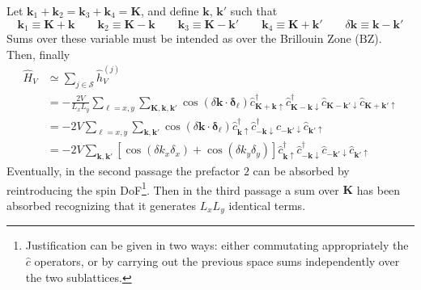 Let $\mathbf{k}_1 + \mathbf{k}_2 = \mathbf{k}_3 + \mathbf{k}_4 = \mathbf{K}$, and define $\mathbf{k}$, $\mathbf{k}'$ such that
\[
	\mathbf{k}_1 \equiv \mathbf{K} + \mathbf{k} 
	\qquad
	\mathbf{k}_2 \equiv \mathbf{K} - \mathbf{k} 
	\qquad
	\mathbf{k}_3 \equiv \mathbf{K} - \mathbf{k}' 
	\qquad
	\mathbf{k}_4 \equiv \mathbf{K} + \mathbf{k}'
	\qquad
	\delta \mathbf{k} \equiv \mathbf{k}-\mathbf{k}'
\]
Sums over these variable must be intended as over the Brillouin Zone ($\mathrm{BZ}$). Then, finally
\[
\begin{aligned}
	\hat H_V &\simeq \sum_{j \in \mathcal{S}} \hat h_V^{(j)} \\
	&= - \frac{2V}{L_x L_y} \sum_{\ell = x,y} \sum_{\mathbf{K}, \mathbf{k}, \mathbf{k}'} \cos\left(
		\delta \mathbf{k} \cdot \bm{\delta}_\ell
	\right)	\hat c_{\mathbf{K}+\mathbf{k} \uparrow}^\dagger \hat c_{\mathbf{K}-\mathbf{k} \downarrow}^\dagger \hat c_{\mathbf{K}-\mathbf{k}' \downarrow} \hat c_{\mathbf{K}+\mathbf{k}'\uparrow} \\
	&= -2V \sum_{\ell = x,y} \sum_{\mathbf{k}, \mathbf{k}'} \cos\left(
		\delta \mathbf{k} \cdot \bm{\delta}_\ell
	\right)	\hat c_{\mathbf{k} \uparrow}^\dagger \hat c_{-\mathbf{k} \downarrow}^\dagger \hat c_{-\mathbf{k}' \downarrow} \hat c_{\mathbf{k}' \uparrow} \\
	&= -2V \sum_{\mathbf{k}, \mathbf{k}'}
	\left[
		\cos \left(
			\delta k_x \delta_x
		\right)	+ \cos \left(
			\delta k_y \delta_y
		\right)	
	\right] \hat c_{\mathbf{k} \uparrow}^\dagger \hat c_{-\mathbf{k} \downarrow}^\dagger \hat c_{-\mathbf{k}' \downarrow} \hat c_{\mathbf{k}' \uparrow}
\end{aligned}
\]
Eventually, in the second passage the prefactor $2$ can be absorbed by reintroducing the spin DoF\footnote{
	Justification can be given in two ways: either commutating appropriately the $\hat c$ operators, or by carrying out the previous space sums independently over the two sublattices.
}. Then in the third passage a sum over $\mathbf{K}$ has been absorbed recognizing that it generates $L_xL_y$ identical terms.

